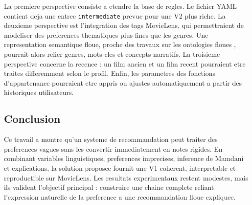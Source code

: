 La premiere perspective consiste a etendre la base de regles. Le fichier YAML contient deja une entree \texttt{intermediate} prevue pour une V2 plus riche. La deuxieme perspective est l'integration des tags MovieLens, qui permettraient de modeliser des preferences thematiques plus fines que les genres. Une representation semantique floue, proche des travaux sur les ontologies floues \cite{bobillo2011}, pourrait alors relier genres, mots-cles et concepts narratifs. La troisieme perspective concerne la recence : un film ancien et un film recent pourraient etre traites differemment selon le profil. Enfin, les parametres des fonctions d'appartenance pourraient etre appris ou ajustes automatiquement a partir des historiques utilisateurs.

\subsection{Conclusion}

Ce travail a montre qu'un systeme de recommandation peut traiter des preferences vagues sans les convertir immediatement en notes rigides. En combinant variables linguistiques, preferences imprecises, inference de Mamdani et explications, la solution proposee fournit une V1 coherent, interpretable et reproductible sur MovieLens. Les resultats experimentaux restent modestes, mais ils valident l'objectif principal : construire une chaine complete reliant l'expression naturelle de la preference a une recommandation floue expliquee.
